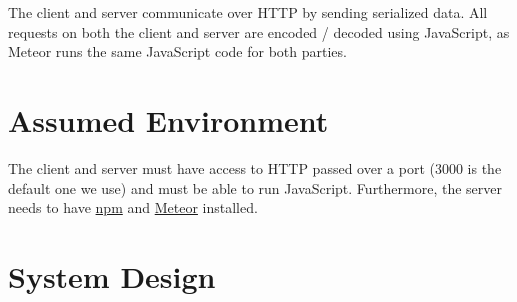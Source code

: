 \documentclass[a4paper, 11pt]{article} %
\begin{document}
The client and server communicate over HTTP by sending serialized data. All requests on both the client and server are encoded / decoded using JavaScript, as Meteor runs the same JavaScript code for both parties. 

\section*{Assumed Environment}


The client and server must have access to HTTP passed over a port (3000 is the default one we use) and must be able to run JavaScript. Furthermore, the server needs to have \href{https://www.npmjs.com/}{npm} and \href{https://www.meteor.com/}{Meteor} installed.

\section*{System Design}
\end{document}
